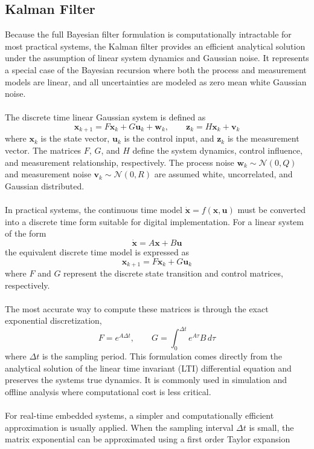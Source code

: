 \subsection{Kalman Filter}
Because the full Bayesian filter formulation is computationally intractable for most practical systems, the Kalman filter provides an efficient analytical solution under the assumption of linear system dynamics and Gaussian noise. It represents a special case of the Bayesian recursion where both the process and measurement models are linear, and all uncertainties are modeled as zero mean white Gaussian noise.  
\\ \\
The discrete time linear Gaussian system is defined as
$$
    \mathbf{x}_{k+1} = F\mathbf{x}_k + G\mathbf{u}_k + \mathbf{w}_k, \qquad
    \mathbf{z}_k = H\mathbf{x}_k + \mathbf{v}_k
$$
where $\mathbf{x}_k$ is the state vector, $\mathbf{u}_k$ is the control input, and $\mathbf{z}_k$ is the measurement vector. The matrices $F$, $G$, and $H$ define the system dynamics, control influence, and measurement relationship, respectively. The process noise $\mathbf{w}_k \sim \mathcal{N}(0, Q)$ and measurement noise $\mathbf{v}_k \sim \mathcal{N}(0, R)$ are assumed white, uncorrelated, and Gaussian distributed.  
\\ \\
In practical systems, the continuous time model $\dot{\mathbf{x}} = f(\mathbf{x}, \mathbf{u})$ must be converted into a discrete time form suitable for digital implementation. For a linear system of the form
$$
    \dot{\mathbf{x}} = A\mathbf{x} + B\mathbf{u}
$$
the equivalent discrete time model is expressed as
$$
    \mathbf{x}_{k+1} = F\mathbf{x}_k + G\mathbf{u}_k
$$
where $F$ and $G$ represent the discrete state transition and control matrices, respectively.  
\\ \\
The most accurate way to compute these matrices is through the exact exponential discretization,
$$
    F = e^{A\Delta t}, \qquad
    G = \int_0^{\Delta t} e^{A\tau}B\,d\tau
$$
where $\Delta t$ is the sampling period. This formulation comes directly from the analytical solution of the linear time invariant (LTI) differential equation and preserves the systems true dynamics. It is commonly used in simulation and offline analysis where computational cost is less critical.  
\\ \\
For real-time embedded systems, a simpler and computationally efficient approximation is usually applied. When the sampling interval $\Delta t$ is small, the matrix exponential can be approximated using a first order Taylor expansion
